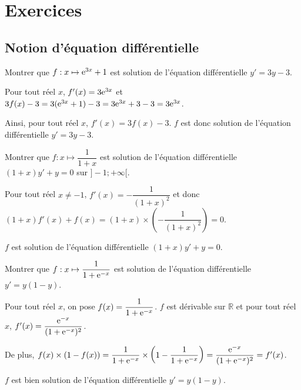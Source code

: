 \documentclass[11pt,fleqn, openany]{book} %
\begin{document}
\chapter{Exercices}


\section*{Notion d'équation différentielle}

\begin{exercise}Montrer que $f:x \mapsto \mathrm{e}^{3x}+1$ est solution de l'équation différentielle $y'=3y-3$.\end{exercise}

\begin{solution}

Pour tout réel \(x\), \(f'(x)=3\mathrm{e}^{3x}\) et \(3f(x)-3=3(\mathrm{e}^{3x}+1)-3=3\mathrm{e}^{3x}+3-3=3\mathrm{e}^{3x}\).

Ainsi, pour tout réel \(x\), \(f'(x)=3f(x)-3\). \(f\) est donc solution de l'équation différentielle \(y'=3y-3\). \end{solution}



\begin{exercise}Montrer que $f:x\mapsto \dfrac{1}{1+x}$ est solution de l'équation différentielle $(1+x)y'+y=0$ sur $]-1;+\infty[$.\end{exercise}

\begin{solution}

Pour tout réel \(x\neq -1\), \(f'(x)=-\dfrac{1}{(1+x)^2}\) et donc $(1+x)f'(x)+f(x)=(1+x)\times \left(-\dfrac{1}{(1+x)^2}\right)=0$.

\(f\) est solution de l'équation différentielle \((1+x)y'+y=0\).

 \end{solution}
 
 

\begin{exercise}Montrer que $f:x \mapsto \dfrac{1}{1+\mathrm{e}^{-x}}$ est solution de l'équation différentielle $y'=y(1-y)$.\end{exercise}

\begin{solution}

Pour tout réel \(x\), on pose \(f(x)=\dfrac{1}{1+\mathrm{e}^{-x}}\). \(f\) est dérivable sur \(\mathbb{R}\) et pour tout réel \(x\), \(f'(x)=\dfrac{\mathrm{e}^{-x}}{(1+\mathrm{e}^{-x})^2}\). 

De plus, $f(x) \times (1-f(x)) = \dfrac{1}{1+\mathrm{e}^{-x}} \times \left(1-\dfrac{1}{1+\mathrm{e}^{-x}}\right)=\dfrac{\mathrm{e}^{-x}}{(1+\mathrm{e}^{-x})^2}=f'(x)$.

 \(f\) est bien solution de l'équation différentielle \(y'=y(1-y)\).
\end{solution}
\end{document}
